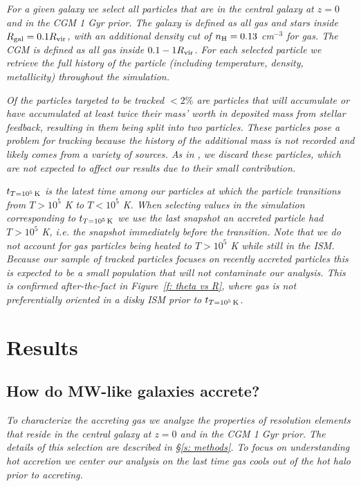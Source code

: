 \documentclass[fleqn,usenatbib]{mnras}
\newcommand{\tcon}{t_{T=10^5\,{\rm K}}}
\begin{document}
\textit{
For a given galaxy we select all particles that are in the central galaxy at $z=0$ and in the CGM 1 Gyr prior.
The galaxy is defined as all gas and stars inside $R_{\rm gal} = 0.1 R_{\rm vir}$, with an additional density cut of $n_{\rm H} = 0.13$ cm$^{-3}$ for gas.
The CGM is defined as all gas inside $0.1 -1 R_{\rm vir}$.
For each selected particle we retrieve the full history of the particle (including temperature, density, metallicity) throughout the simulation.
}

\textit{
Of the particles targeted to be tracked $<2\%$ are particles that will accumulate or have accumulated at least twice their mass' worth in deposited mass from stellar feedback, resulting in them being split into two particles.
These particles pose a problem for tracking because the history of the additional mass is not recorded and likely comes from a variety of sources.
As in \cite{Hafen2019}, we discard these particles, which are not expected to affect our results due to their small contribution.
}

\textit{
$\tcon$ is the latest time among our particles at which the particle transitions from $T > 10^5$ K to $T< 10^5$ K.
When selecting values in the simulation corresponding to $\tcon$ we use the last snapshot an accreted particle had $T > 10^5$ K, i.e. the snapshot immediately before the transition.
Note that we do not account for gas particles being heated to $T > 10^5$ K while still in the ISM.
Because our sample of tracked particles focuses on recently accreted particles this is expected to be a small population that will not contaminate our analysis.
This is confirmed after-the-fact in Figure~\ref{f: theta vs R}, where gas is not preferentially oriented in a disky ISM prior to $\tcon$.
}

\section{Results}
\label{s: results}


\subsection{How do MW-like galaxies accrete?}
\label{s: characteristics}

\textit{
To characterize the accreting gas we analyze the properties of resolution elements that reside in the central galaxy at $z=0$ and in the CGM 1 Gyr prior.
The details of this selection are described in \S\ref{s: methods}.
To focus on understanding hot accretion we center our analysis on the last time gas cools out of the hot halo prior to accreting.
}
\end{document}
